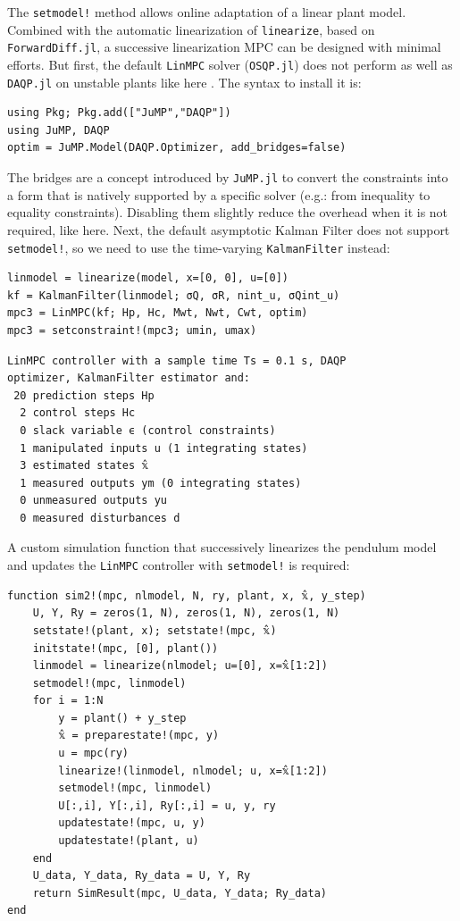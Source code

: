 The \texttt{setmodel!} method allows online adaptation of a linear plant model. Combined with the automatic linearization of \texttt{linearize}, based on \texttt{ForwardDiff.jl}, a successive linearization MPC can be designed with minimal efforts. But first, the default \texttt{LinMPC} solver (\texttt{OSQP.jl}) does not perform as well as \texttt{DAQP.jl} on unstable plants like here \citep{daqp}. The syntax to install it is: 
\begin{verbatim}
using Pkg; Pkg.add(["JuMP","DAQP"])
using JuMP, DAQP
optim = JuMP.Model(DAQP.Optimizer, add_bridges=false)
\end{verbatim}
The bridges are a concept introduced by \texttt{JuMP.jl} to convert the constraints into a form that is natively supported by a specific solver (e.g.: from inequality to equality constraints). Disabling them slightly reduce the overhead when it is not required, like here. Next, the default asymptotic Kalman Filter does not support \texttt{setmodel!}, so we need to use the time-varying \texttt{KalmanFilter} instead:
\begin{verbatim}
linmodel = linearize(model, x=[0, 0], u=[0])
kf = KalmanFilter(linmodel; σQ, σR, nint_u, σQint_u)
mpc3 = LinMPC(kf; Hp, Hc, Mwt, Nwt, Cwt, optim)
mpc3 = setconstraint!(mpc3; umin, umax)
\end{verbatim}
\spacerepl
\begin{verbatim}
LinMPC controller with a sample time Ts = 0.1 s, DAQP
optimizer, KalmanFilter estimator and:
 20 prediction steps Hp
  2 control steps Hc
  0 slack variable ϵ (control constraints)
  1 manipulated inputs u (1 integrating states)
  3 estimated states 𝕩̂
  1 measured outputs ym (0 integrating states)
  0 unmeasured outputs yu
  0 measured disturbances d
\end{verbatim}
A custom simulation function that successively linearizes the pendulum model and updates the \texttt{LinMPC} controller with \texttt{setmodel!} is required: 
\begin{verbatim}
function sim2!(mpc, nlmodel, N, ry, plant, x, 𝕩̂, y_step)
    U, Y, Ry = zeros(1, N), zeros(1, N), zeros(1, N)
    setstate!(plant, x); setstate!(mpc, 𝕩̂)
    initstate!(mpc, [0], plant())
    linmodel = linearize(nlmodel; u=[0], x=𝕩̂[1:2])
    setmodel!(mpc, linmodel)
    for i = 1:N
        y = plant() + y_step
        𝕩̂ = preparestate!(mpc, y)
        u = mpc(ry)
        linearize!(linmodel, nlmodel; u, x=𝕩̂[1:2])
        setmodel!(mpc, linmodel) 
        U[:,i], Y[:,i], Ry[:,i] = u, y, ry
        updatestate!(mpc, u, y)
        updatestate!(plant, u)
    end
    U_data, Y_data, Ry_data = U, Y, Ry
    return SimResult(mpc, U_data, Y_data; Ry_data)
end
\end{verbatim}
